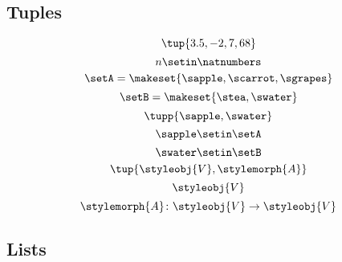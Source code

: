 \begin{forslides}
\subsection{Tuples}

 \begin{equation}\label{slides_session2_31}
\tup{3.5, -2, 7, 68}
\end{equation}
\begin{equation}\label{slides_session2_32}
n \setin \natnumbers
\end{equation}
 \begin{equation}\label{slides_session2_33}
\setA = \makeset{ \sapple, \scarrot, \sgrapes}
\end{equation}
\begin{equation}\label{slides_session2_34}
\setB = \makeset{ \stea, \swater }
\end{equation}
 \begin{equation}\label{slides_session2_35}
\tupp{\sapple, \swater}
\end{equation}
\begin{equation}\label{slides_session2_36}
\sapple \setin\setA
\end{equation}
 \begin{equation}\label{slides_session2_37}
\swater \setin\setB
\end{equation}
\begin{equation}\label{slides_session2_38}
\tup{\styleobj{V}, \stylemorph{A}}
\end{equation}
 \begin{equation}\label{slides_session2_39}
\styleobj{V}
\end{equation}
\begin{equation}\label{slides_session2_40}
\stylemorph{A}\colon \styleobj{V} \to \styleobj{V}
\end{equation}

\subsection{Lists}


\end{forslides}
